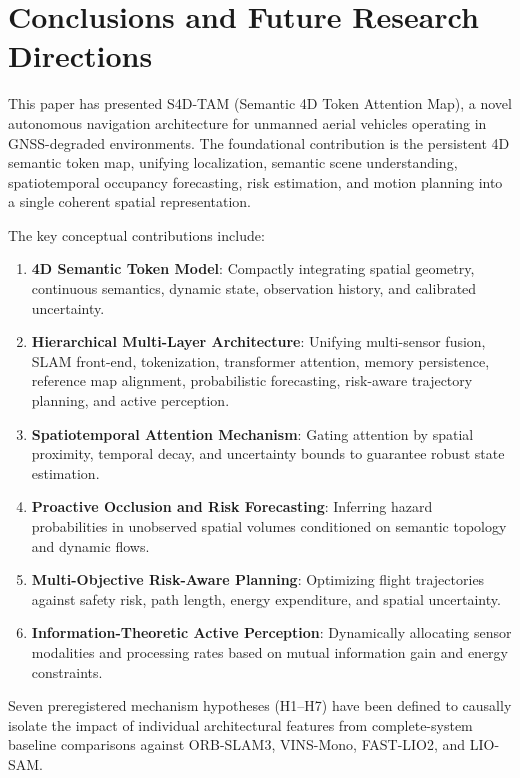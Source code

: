\section{Conclusions and Future Research Directions}
\label{sec:conclusions}

This paper has presented S4D-TAM (Semantic 4D Token Attention Map), a novel autonomous navigation architecture for unmanned aerial vehicles operating in GNSS-degraded environments. The foundational contribution is the persistent 4D semantic token map, unifying localization, semantic scene understanding, spatiotemporal occupancy forecasting, risk estimation, and motion planning into a single coherent spatial representation.

The key conceptual contributions include:
\begin{enumerate}
  \item \textbf{4D Semantic Token Model}: Compactly integrating spatial geometry, continuous semantics, dynamic state, observation history, and calibrated uncertainty.
  \item \textbf{Hierarchical Multi-Layer Architecture}: Unifying multi-sensor fusion, SLAM front-end, tokenization, transformer attention, memory persistence, reference map alignment, probabilistic forecasting, risk-aware trajectory planning, and active perception.
  \item \textbf{Spatiotemporal Attention Mechanism}: Gating attention by spatial proximity, temporal decay, and uncertainty bounds to guarantee robust state estimation.
  \item \textbf{Proactive Occlusion and Risk Forecasting}: Inferring hazard probabilities in unobserved spatial volumes conditioned on semantic topology and dynamic flows.
  \item \textbf{Multi-Objective Risk-Aware Planning}: Optimizing flight trajectories against safety risk, path length, energy expenditure, and spatial uncertainty.
  \item \textbf{Information-Theoretic Active Perception}: Dynamically allocating sensor modalities and processing rates based on mutual information gain and energy constraints.
\end{enumerate}

Seven preregistered mechanism hypotheses (H1--H7) have been defined to causally isolate the impact of individual architectural features from complete-system baseline comparisons against ORB-SLAM3, VINS-Mono, FAST-LIO2, and LIO-SAM.

